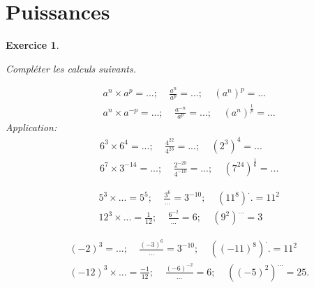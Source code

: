 \documentclass [10pt,a4paper] {article}
\newcommand{\bit} {\begin{itemize} }
\newcommand{\eit} {\end{itemize} }
\newtheorem{exo}{Exercice}
\begin{document}
%
%
%




\section{Puissances}

\vspace{0.25cm}


\begin{exo}%
\textcolor{white}{s}

Compléter les calculs suivants.

\begin{eqnarray*}
&& a^n\times a^p=...;~~~~~\frac{a^n}{a^p}=...;~~~~~(a^n)^p=...\\
&& a^n\times a^{-p}=...;~~~~~\frac{a^{-n}}{a^p}=...;~~~~~(a^n)^{\frac{1}{p}}=...
\end{eqnarray*}
Application:
\begin{eqnarray*}
&&6^3\times 6^4=...;~~~~~\frac{4^{22}}{4^{23}}=...;~~~~~(2^3)^4=...\\
&& 6^7\times 3^{-14}=...;~~~~~\frac{2^{-20}}{4^{-10}}=...;~~~~~(7^{24})^{\frac{1}{6}}=...
\end{eqnarray*}

\begin{eqnarray*}
&& 5^3\times ...=5^5;~~~~~\frac{3^6}{...}=3^{-10};~~~~~(11^8)^..=11^2\\
&& 12^3\times ...=\frac{1}{12};~~~~~\frac{6^{-2}}{...}=6;~~~~~(9^2)^{...}=3
\end{eqnarray*}

\begin{eqnarray*}
&& (-2)^3=...;~~~~~\frac{(-3)^6}{...}=3^{-10};~~~~~((-11)^8)^..=11^2\\
&& (-12)^3\times ...=\frac{-1}{12};~~~~~\frac{(-6)^{-2}}{...}=6;~~~~~((-5)^2)^{...}=25.
\end{eqnarray*}
\end{exo}
\end{document}
